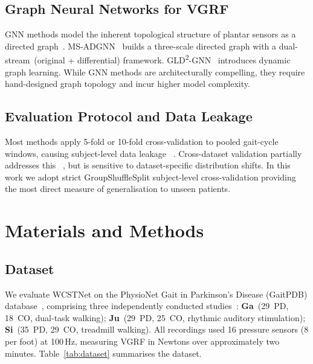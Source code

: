\documentclass[lettersize,journal]{IEEEtran}
\begin{document}
\subsection{Graph Neural Networks for VGRF}
GNN methods model the inherent topological structure of plantar sensors
as a directed graph~\cite{zhong2022rfdgad,wang2023astdgnn}.
MS-ADGNN~\cite{wang2026msadgnn} builds a three-scale directed graph
with a dual-stream~(original + differential) framework.
GLD\textsuperscript{2}-GNN~\cite{wang2025gld2gnn} introduces dynamic
graph learning.
While GNN methods are architecturally compelling, they require
hand-designed graph topology and incur higher model complexity.

\subsection{Evaluation Protocol and Data Leakage}
Most methods apply 5-fold or 10-fold cross-validation to pooled
gait-cycle windows, causing subject-level data leakage~%
\cite{wang2026msadgnn}.
Cross-dataset validation partially addresses this~%
\cite{wang2023astdgnn,wang2026msadgnn}, but is sensitive to
dataset-specific distribution shifts.
In this work we adopt strict GroupShuffleSplit subject-level
cross-validation providing the most direct measure of generalisation
to unseen patients.

\section{Materials and Methods}
\label{sec:method}

\subsection{Dataset}
\label{sec:dataset}

We evaluate WCSTNet on the PhysioNet Gait in Parkinson's Disease
(GaitPDB) database~\cite{physionet2000}, comprising three independently
conducted studies~\cite{yogev2005,hausdorff2007,frenkel2005}:
\textbf{Ga}~(29~PD, 18~CO, dual-task walking);
\textbf{Ju}~(29~PD, 25~CO, rhythmic auditory stimulation);
\textbf{Si}~(35~PD, 29~CO, treadmill walking).
All recordings used 16 pressure sensors (8 per foot) at 100\,Hz,
measuring VGRF in Newtons over approximately two minutes.
Table~\ref{tab:dataset} summarises the dataset.
\end{document}
